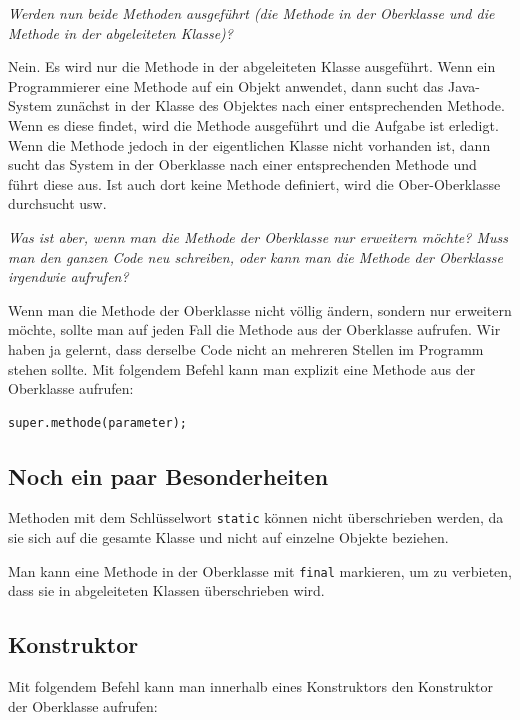 \emph{Werden nun beide Methoden ausgeführt (die Methode in der Oberklasse und
die Methode in der abgeleiteten Klasse)?}

Nein. Es wird nur die Methode in der abgeleiteten Klasse ausgeführt. Wenn ein
Programmierer eine Methode auf ein Objekt anwendet, dann sucht das Java-System
zunächst in der Klasse des Objektes nach einer entsprechenden Methode. Wenn es
diese findet, wird die Methode ausgeführt und die Aufgabe ist erledigt. Wenn
die Methode jedoch in der eigentlichen Klasse nicht vorhanden ist, dann sucht
das System in der Oberklasse nach einer entsprechenden Methode und führt diese
aus. Ist auch dort keine Methode definiert, wird die Ober-Oberklasse
durchsucht usw.

\emph{Was ist aber, wenn man die Methode der Oberklasse nur erweitern möchte?
Muss man den ganzen Code neu schreiben, oder kann man die Methode der
Oberklasse irgendwie aufrufen?} 

Wenn man die Methode der Oberklasse nicht völlig ändern, sondern nur erweitern
möchte, sollte man auf jeden Fall die Methode aus der Oberklasse aufrufen. Wir
haben ja gelernt, dass derselbe Code nicht an mehreren Stellen im Programm
stehen sollte. Mit folgendem Befehl kann man explizit eine Methode aus der
Oberklasse aufrufen:

\begin{lstlisting}
super.methode(parameter);
\end{lstlisting}


\subsection{Noch ein paar Besonderheiten}

\begin{compactitem}
\item Methoden mit dem Schlüsselwort \lstinline|static| können nicht überschrieben
werden, da sie sich auf die gesamte Klasse und nicht auf einzelne Objekte
beziehen.
\item Man kann eine Methode in der Oberklasse mit \lstinline|final| markieren, um zu
verbieten, dass sie in abgeleiteten Klassen überschrieben wird.
\end{compactitem}


\subsection{Konstruktor}

Mit folgendem Befehl kann man innerhalb eines Konstruktors den Konstruktor der
Oberklasse aufrufen:

